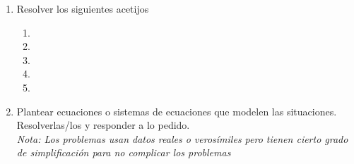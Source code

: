 \documentclass[a4paper]{article}
\makeatletter
\newcommand{\answer}{\item[**]}
\newcommand{\exercise}{\item}
\newcommand{\img}[2]{ \begin{minipage}[t]{\linewidth} \raisebox{-\height}{\texttt{[image: \#2]}} \end{minipage} }
\newenvironment{amatrix}[1]{%
  \left(\begin{array}{@{}*{#1}{c}|c@{}}
}{%
  \end{array}\right)
}
\makeatother
\begin{document}
\begin{enumerate}
\begin{multicols}{2}
\begin{enumerate} [label=(\alph*)]
		\item $\begin{amatrix}{4} 1 & -1 & 2 & 3 & -2 \\ 0 & 0 & 0 & 0 & 3 \\ 0 & 0 & 0 & 0 & 0 \end{amatrix}$
		\answer $rg(A)=1 \neq rg(A^*)=2$. Sistema incompatible. $S=\emptyset$.

		\item $\begin{amatrix}{4} 1 & 0 & 0 & -1 & \frac{1}{2} \\ 0 & 0 & 1 & \frac{3}{4} & 2 \\ 0 & 0 & 0 & 0 & 0 \end{amatrix}$
		\answer $rg(A)=rg(A^*)=2<n=4$. Sistema compatible indeterminado cuya solución depende de 2 parámetros. \\ $(x,y,z,w)=(\frac{1}{2}+w,y,2-\frac{3}{4}w,w)$. \\ $S=\left\{(x,y,z,w)\in \mathbb{R}^4 ~|~ x=\frac{1}{2}+w ~\land~ z=\frac{3}{4}w ~\land~ w=0 \right\}$. \\ Con $y=1$ y $w=1$ $\to (\frac{3}{2},1,\frac{5}{4},1)$. Con $y=1$ y $w=2$ $\to (\frac{5}{2},1,\frac{1}{2},2)$. Con $y=2$ y $w=0$ $\to (\frac{1}{2},2,2,0)$.

	\end{enumerate}
	\end{multicols}

	\exercise Resolver los siguientes acetijos
	\begin{multicols}{2}
		\begin{enumerate}[label=(\alph*)]
		
			\item \img{1.05\textwidth}{img/table_puzzle.png}
			\item \img{\textwidth}{img/fruit_puzzle.png}
			\item \img{0.6\textwidth}{img/square_puzzle.png}
			\item \img{\textwidth}{img/fruit_puzzle2.png}
			\item \img{\textwidth}{img/weight_puzzle.png}
		
		\end{enumerate}
		\end{multicols}


	\exercise Plantear ecuaciones o sistemas de ecuaciones que modelen las situaciones. Resolverlas/los y responder a lo pedido. \\ \textit{Nota: Los problemas usan datos reales o verosímiles pero tienen cierto grado de simplificación para no complicar los problemas}
	\begin{enumerate} [label=(\alph*)]


\end{enumerate}
\end{enumerate}
\end{document}
